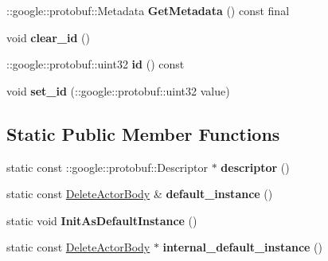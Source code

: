 \begin{DoxyCompactItemize}
\item 
\mbox{\label{classtbBasics_1_1DeleteActorBody_abfb32cc3aed593a3e552f4ae78fb72ea}} 
\+::google\+::protobuf\+::\+Metadata {\bfseries Get\+Metadata} () const final
\item 
\mbox{\label{classtbBasics_1_1DeleteActorBody_a6d9d3d43f82d17ab4197fb9f4532d499}} 
void {\bfseries clear\+\_\+id} ()
\item 
\mbox{\label{classtbBasics_1_1DeleteActorBody_a78d4ec52e47da5b0c749d11880bd22bb}} 
\+::google\+::protobuf\+::uint32 {\bfseries id} () const
\item 
\mbox{\label{classtbBasics_1_1DeleteActorBody_a2657a381b7395d0049039ecefded4f68}} 
void {\bfseries set\+\_\+id} (\+::google\+::protobuf\+::uint32 value)
\end{DoxyCompactItemize}
\subsection*{Static Public Member Functions}
\begin{DoxyCompactItemize}
\item 
\mbox{\label{classtbBasics_1_1DeleteActorBody_aba075109825237a68de0f7d0000f4494}} 
static const \+::google\+::protobuf\+::\+Descriptor $\ast$ {\bfseries descriptor} ()
\item 
\mbox{\label{classtbBasics_1_1DeleteActorBody_a2c871e8f233879676e53e1338cd8c1b2}} 
static const \hyperlink{classtbBasics_1_1DeleteActorBody}{Delete\+Actor\+Body} \& {\bfseries default\+\_\+instance} ()
\item 
\mbox{\label{classtbBasics_1_1DeleteActorBody_ad16dab8ad538008a2a1b2a2a529f2b8c}} 
static void {\bfseries Init\+As\+Default\+Instance} ()
\item 
\mbox{\label{classtbBasics_1_1DeleteActorBody_a875912c1e1aec71a617d25ad43a99001}} 
static const \hyperlink{classtbBasics_1_1DeleteActorBody}{Delete\+Actor\+Body} $\ast$ {\bfseries internal\+\_\+default\+\_\+instance} ()
\end{DoxyCompactItemize}
